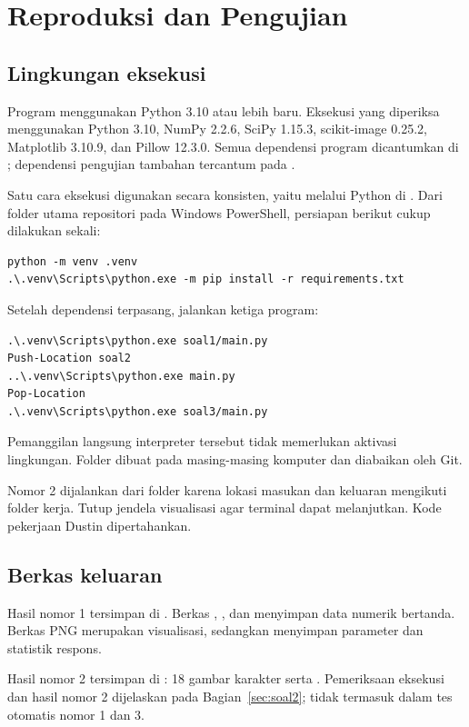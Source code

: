 \section{Reproduksi dan Pengujian}
\label{sec:reproduksi}

\subsection{Lingkungan eksekusi}
Program menggunakan Python 3.10 atau lebih baru. Eksekusi yang diperiksa
menggunakan Python 3.10, NumPy 2.2.6, SciPy 1.15.3, scikit-image 0.25.2,
Matplotlib 3.10.9, dan Pillow 12.3.0. Semua dependensi program dicantumkan
di ; dependensi pengujian tambahan tercantum pada
.

Satu cara eksekusi digunakan secara konsisten, yaitu melalui Python di
. Dari folder utama repositori pada Windows PowerShell,
persiapan berikut cukup dilakukan sekali:
\begin{lstlisting}[style=terminal]
python -m venv .venv
.\.venv\Scripts\python.exe -m pip install -r requirements.txt
\end{lstlisting}
Setelah dependensi terpasang, jalankan ketiga program:
\begin{lstlisting}[style=terminal]
.\.venv\Scripts\python.exe soal1/main.py
Push-Location soal2
..\.venv\Scripts\python.exe main.py
Pop-Location
.\.venv\Scripts\python.exe soal3/main.py
\end{lstlisting}
Pemanggilan langsung interpreter tersebut tidak memerlukan aktivasi
lingkungan. Folder  dibuat pada masing-masing komputer dan
diabaikan oleh Git.

Nomor 2 dijalankan dari folder  karena lokasi masukan
dan keluaran mengikuti folder kerja. Tutup jendela visualisasi agar terminal
dapat melanjutkan. Kode pekerjaan Dustin dipertahankan.

\subsection{Berkas keluaran}
Hasil nomor 1 tersimpan di . Berkas ,
, dan  menyimpan data numerik bertanda.
Berkas PNG merupakan visualisasi, sedangkan 
menyimpan parameter dan statistik respons.

Hasil nomor 2 tersimpan di : 18 gambar
karakter serta . Pemeriksaan eksekusi dan hasil
nomor 2 dijelaskan pada Bagian~\ref{sec:soal2}; tidak termasuk dalam
tes otomatis nomor 1 dan 3.

